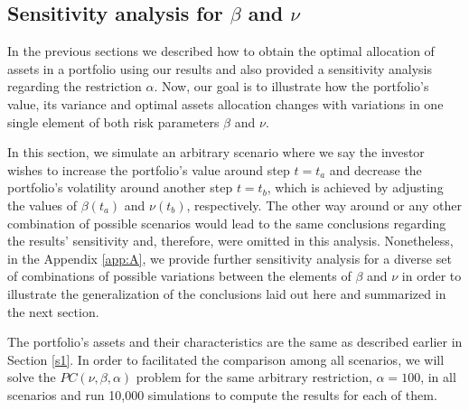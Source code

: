 \subsection{Sensitivity analysis for $\beta$ and $\nu$} \label{specific}

In the previous sections we described how to obtain the optimal allocation of assets in a portfolio using our results and also provided a sensitivity analysis regarding the restriction $\alpha$. Now, our goal is to illustrate how the portfolio's value, its variance and optimal assets allocation changes with variations in one single element of both risk parameters $\beta$ and $\nu$.

In this section, we simulate an arbitrary scenario where we say the investor wishes to increase the portfolio's value around step $t=t_a$ and decrease the portfolio's volatility around another step $t=t_b$, which is achieved by adjusting the values of $\beta(t_a)$ and $\nu(t_b)$, respectively. The other way around or any other combination of possible scenarios would lead to the same conclusions regarding the results' sensitivity and, therefore, were omitted in this analysis. Nonetheless, in the Appendix \ref{app:A}, we provide further sensitivity analysis for a diverse set of combinations of possible variations between the elements of $\beta$ and $\nu$ in order to illustrate the generalization of the conclusions laid out here and summarized in the next section.

The portfolio's assets and their characteristics are the same as described earlier in Section \ref{s1}. In order to facilitated the comparison among all scenarios, we will solve the $PC(\nu,\beta,\alpha)$ problem for the same arbitrary restriction, $\alpha=100$, in all scenarios and run  10,000 simulations to compute the results for each of them.


